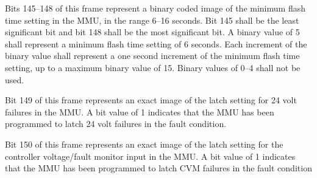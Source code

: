 \documentclass[]{article}
\begin{document}
Bits 145–148 of this frame represent a binary coded image of the minimum flash time setting in the MMU,
in the range 6–16 seconds. Bit 145 shall be the least significant bit and bit 148 shall be the most
significant bit. A binary value of 5 shall represent a minimum flash time setting of 6 seconds. Each
increment of the binary value shall represent a one second increment of the minimum flash time setting,
up to a maximum binary value of 15. Binary values of 0–4 shall not be used.

Bit 149 of this frame represents an exact image of the latch setting for 24 volt failures in the MMU. A bit value of 1 indicates that the MMU has been programmed to latch 24 volt failures in the fault condition.

Bit 150 of this frame represents an exact image of the latch setting for the controller voltage/fault monitor input in the MMU. A bit value of 1 indicates that the MMU has been programmed to latch CVM failures in the fault condition
\end{document}
